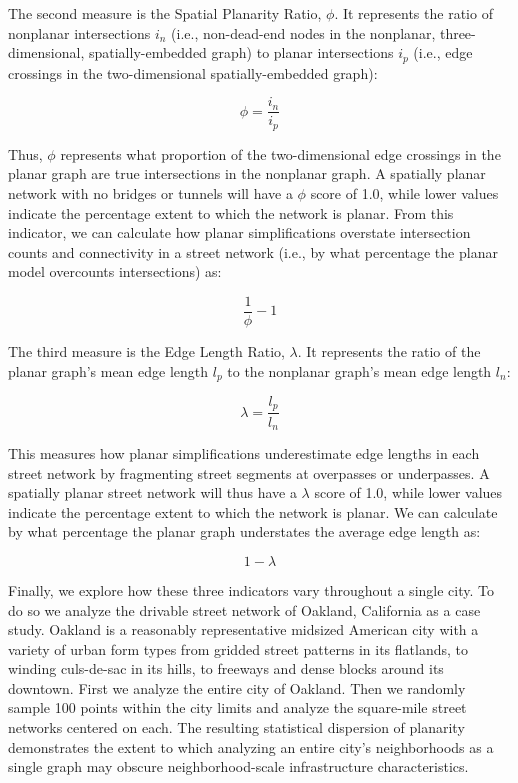 \documentclass[Afour,sageh,times]{sagej}
\begin{document}
The second measure is the Spatial Planarity Ratio, $\phi$. It represents the ratio of nonplanar intersections $i_n$ (i.e., non-dead-end nodes in the nonplanar, three-dimensional, spatially-embedded graph) to planar intersections $i_p$ (i.e., edge crossings in the two-dimensional spatially-embedded graph): 

\begin{equation}
	\label{eq:spr}
	\phi = \frac{i_n}{i_p}
\end{equation}

Thus, $\phi$ represents what proportion of the two-dimensional edge crossings in the planar graph are true intersections in the nonplanar graph. A spatially planar network with no bridges or tunnels will have a $\phi$ score of 1.0, while lower values indicate the percentage extent to which the network is planar. From this indicator, we can calculate how planar simplifications overstate intersection counts and connectivity in a street network (i.e., by what percentage the planar model overcounts intersections) as:

\begin{equation}
	\label{eq:spr_overstates}
	\frac{1}{\phi} - 1
\end{equation}

The third measure is the Edge Length Ratio, $\lambda$. It represents the ratio of the planar graph's mean edge length $l_p$ to the nonplanar graph's mean edge length $l_n$:

\begin{equation}
	\label{eq:elr}
	\lambda = \frac{l_p}{l_n}
\end{equation}

This measures how planar simplifications underestimate edge lengths in each street network by fragmenting street segments at overpasses or underpasses. A spatially planar street network will thus have a $\lambda$ score of 1.0, while lower values indicate the percentage extent to which the network is planar. We can calculate by what percentage the planar graph understates the average edge length as:

\begin{equation}
	\label{eq:elr_understates}
	1 - \lambda
\end{equation}

Finally, we explore how these three indicators vary throughout a single city. To do so we analyze the drivable street network of Oakland, California as a case study. Oakland is a reasonably representative midsized American city with a variety of urban form types from gridded street patterns in its flatlands, to winding culs-de-sac in its hills, to freeways and dense blocks around its downtown. First we analyze the entire city of Oakland. Then we randomly sample 100 points within the city limits and analyze the square-mile street networks centered on each. The resulting statistical dispersion of planarity demonstrates the extent to which analyzing an entire city's neighborhoods as a single graph may obscure neighborhood-scale infrastructure characteristics.
\end{document}
